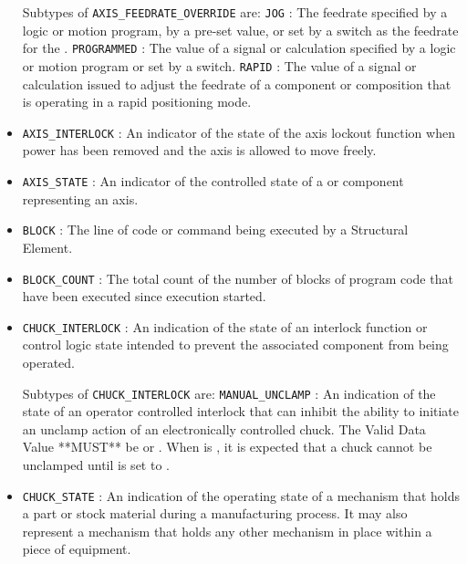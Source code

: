 \begin{itemize}
Subtypes of \texttt{AXIS_FEEDRATE_OVERRIDE} are: 
\newline\tab \texttt{JOG} : The feedrate specified by a logic or motion program, by a pre-set value, or set by a switch as the feedrate for the .  
\newline\tab \texttt{PROGRAMMED} : The value of a signal or calculation specified by a logic or motion program or set by a switch. 
\newline\tab \texttt{RAPID} : The value of a signal or calculation issued to adjust the feedrate of a component or composition that is operating in a rapid positioning mode. 
\item \texttt{AXIS_INTERLOCK} : An indicator of the state of the axis lockout function when power has been removed and the axis is allowed to move freely. 

\item \texttt{AXIS_STATE} : An indicator of the controlled state of a  or  component representing an axis. 

\item \texttt{BLOCK} : The line of code or command being executed by a  \gls{Structural Element}. 

\item \texttt{BLOCK_COUNT} : The total count of the number of blocks of program code that have been executed since execution started. 

\item \texttt{CHUCK_INTERLOCK} : An indication of the state of an interlock function or control logic state intended to prevent the associated  component from being operated. 

Subtypes of \texttt{CHUCK_INTERLOCK} are: 
\newline\tab \texttt{MANUAL_UNCLAMP} : An indication of the state of an operator controlled interlock that can inhibit the ability to initiate an unclamp action of an electronically controlled chuck.
 The \gls{Valid Data Value} **MUST** be  or . 
 When  is , it is expected that a chuck cannot be unclamped until  is set to .  
\item \texttt{CHUCK_STATE} : An indication of the operating state of a mechanism that holds a part or stock material during a manufacturing process. It may also represent a mechanism that holds any other mechanism in place within a piece of equipment. 


\end{itemize}
